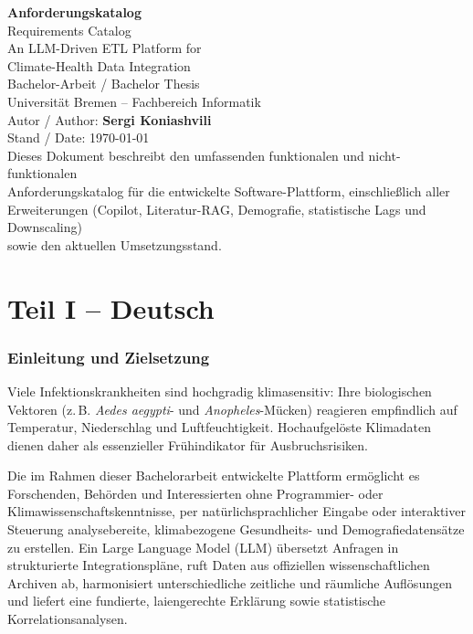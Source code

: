 \documentclass[11pt,a4paper]{article}
\begin{document}
\begin{titlepage}
\centering
\vspace*{2.5cm}
{\Huge\bfseries\color{brandgreen} Anforderungskatalog}\\[0.3cm]
{\Large Requirements Catalog}\\[1.5cm]
{\LARGE An LLM-Driven ETL Platform for\\ Climate-Health Data Integration}\\[1.8cm]
{\large Bachelor-Arbeit / Bachelor Thesis}\\[0.3cm]
{\large Universit\"at Bremen -- Fachbereich Informatik}\\[1.8cm]
{\large Autor / Author: \textbf{Sergi Koniashvili}}\\[0.4cm]
{\large Stand / Date: \today}\\[2.5cm]
{\normalsize Dieses Dokument beschreibt den umfassenden funktionalen und nicht-funktionalen\\
Anforderungskatalog f\"ur die entwickelte Software-Plattform, einschlie\ss{}lich aller\\
Erweiterungen (Copilot, Literatur-RAG, Demografie, statistische Lags und Downscaling)\\
sowie den aktuellen Umsetzungsstand.}
\vfill
\end{titlepage}

\tableofcontents
\newpage

\part*{Teil I -- Deutsch}

\section{Einleitung und Zielsetzung}

Viele Infektionskrankheiten sind hochgradig klimasensitiv: Ihre biologischen Vektoren
(z.\,B. \emph{Aedes aegypti}- und \emph{Anopheles}-M\"ucken) reagieren empfindlich
auf Temperatur, Niederschlag und Luftfeuchtigkeit. Hochaufgel\"oste Klimadaten dienen
daher als essenzieller Fr\"uhindikator f\"ur Ausbruchsrisiken. 

Die im Rahmen dieser Bachelorarbeit entwickelte Plattform erm\"oglicht es
Forschenden, Beh\"orden und Interessierten ohne Programmier- oder Klimawissenschafts\-kenntnisse,
per nat\"urlichsprachlicher Eingabe oder interaktiver Steuerung analysebereite,
klimabezogene Gesundheits- und Demografiedatens\"atze zu erstellen. Ein Large Language
Model (LLM) \"ubersetzt Anfragen in strukturierte Integrationspl\"ane, ruft Daten aus
offiziellen wissenschaftlichen Archiven ab, harmonisiert unterschiedliche zeitliche
und r\"aumliche Aufl\"osungen und liefert eine fundierte, laiengerechte Erkl\"arung
sowie statistische Korrelationsanalysen.
\end{document}
